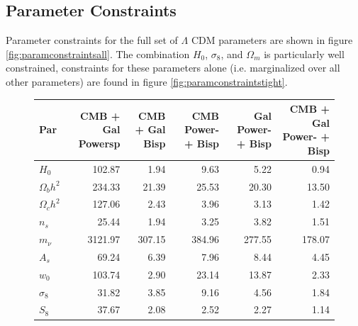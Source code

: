 \documentclass[11pt]{article} %
\begin{document}
\subsection{Parameter Constraints}
Parameter constraints for the full set of $\Lambda$ CDM parameters are shown in figure \ref{fig:paramconstraintsall}. The combination $H_0$, $\sigma_8$, and $\Omega_m$ is particularly well constrained, constraints for these parameters alone (i.e. marginalized over all other parameters) are found in figure \ref{fig:paramconstraintstight}. 



\begin{figure}
    \centering
    \tiny
    \begin{tabular}{lrrrrr}
        \hline
         Par                       &   CMB + Gal Powersp &   CMB + Gal Bisp &   CMB Power- + Bisp &   Gal Power- + Bisp &   CMB + Gal Power- + Bisp \\
        \hline
         $H_0$                     &              102.87 &             1.94 &                9.63 &                5.22 &                      0.94 \\
         $\Omega_b h^2$            &              234.33 &            21.39 &               25.53 &               20.30 &                     13.50 \\
         $\Omega_c h^2$            &              127.06 &             2.43 &                3.96 &                3.13 &                      1.42 \\
         $n_s$                     &               25.44 &             1.94 &                3.25 &                3.82 &                      1.51 \\
         $m_\nu$                   &             3121.97 &           307.15 &              384.96 &              277.55 &                    178.07 \\
         $A_s$                     &               69.24 &             6.39 &                7.96 &                8.44 &                      4.45 \\
         $w_0$                     &              103.74 &             2.90 &               23.14 &               13.87 &                      2.33 \\
         \hline
         \hline
         $\sigma_8$                &               31.82 &             3.85 &                9.16 &                4.56 &                      1.84 \\
         $S_8$                     &               37.67 &             2.08 &                2.52 &                2.27 &                      1.14 \\

\end{tabular}
\end{figure}
\end{document}
